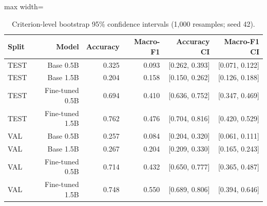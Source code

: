 \begin{table}[t]
\centering
\caption{Criterion-level bootstrap 95\% confidence intervals (1,000 resamples; seed 42).}
\label{tab:main-results}
\begin{adjustbox}{max width=\columnwidth}
\begin{tabular}{lrrrrr}
\toprule
Split & Model & Accuracy & Macro-F1 & Accuracy CI & Macro-F1 CI \\
\midrule
TEST & Base 0.5B & 0.325 & 0.093 & [0.262, 0.393] & [0.071, 0.122] \\
TEST & Base 1.5B & 0.204 & 0.158 & [0.150, 0.262] & [0.126, 0.188] \\
TEST & Fine-tuned 0.5B & 0.694 & 0.410 & [0.636, 0.752] & [0.347, 0.469] \\
TEST & Fine-tuned 1.5B & 0.762 & 0.476 & [0.704, 0.816] & [0.420, 0.529] \\
VAL & Base 0.5B & 0.257 & 0.084 & [0.204, 0.320] & [0.061, 0.111] \\
VAL & Base 1.5B & 0.267 & 0.204 & [0.209, 0.330] & [0.165, 0.243] \\
VAL & Fine-tuned 0.5B & 0.714 & 0.432 & [0.650, 0.777] & [0.365, 0.487] \\
VAL & Fine-tuned 1.5B & 0.748 & 0.550 & [0.689, 0.806] & [0.394, 0.646] \\
\bottomrule
\end{tabular}
\end{adjustbox}
\end{table}
